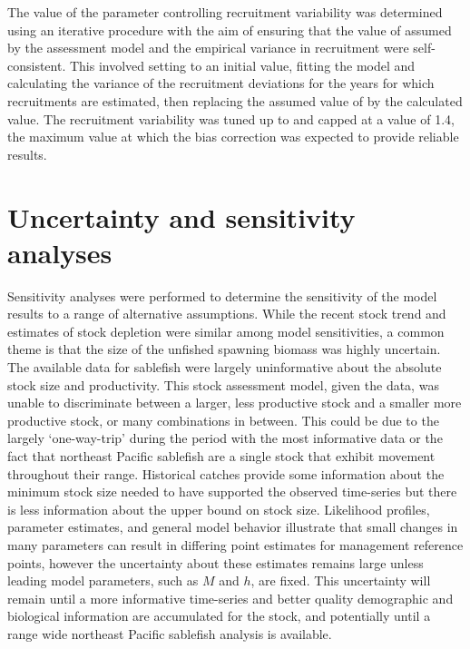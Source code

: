 \documentclass[11pt,
  english,
  a4paper,
]{article}
\begin{document}
\leavevmode\tagmcend\tagstructend\par


The value of the parameter controlling recruitment variability was determined using an iterative procedure with the aim of ensuring that the value of assumed by the assessment model and the empirical variance in recruitment were self-consistent. This involved setting to an initial value, fitting the model and calculating the variance of the recruitment deviations for the years for which recruitments are estimated, then replacing the assumed value of by the calculated value. The recruitment variability was tuned up to and capped at a value of 1.4, the maximum value at which the bias correction was expected to provide reliable results.

\leavevmode\tagmcend\tagstructend\par


\hypertarget{uncertainty-and-sensitivity-analyses}{%
\section{Uncertainty and sensitivity analyses}\label{uncertainty-and-sensitivity-analyses}}

\leavevmode\tagmcend\tagstructend


Sensitivity analyses were performed to determine the sensitivity of the model results to a range of alternative assumptions. While the recent stock trend and estimates of stock depletion were similar among model sensitivities, a common theme is that the size of the unfished spawning biomass was highly uncertain. The available data for sablefish were largely uninformative about the absolute stock size and productivity. This stock assessment model, given the data, was unable to discriminate between a larger, less productive stock and a smaller more productive stock, or many combinations in between. This could be due to the largely `one-way-trip' during the period with the most informative data or the fact that northeast Pacific sablefish are a single stock that exhibit movement throughout their range. Historical catches provide some information about the minimum stock size needed to have supported the observed time-series but there is less information about the upper bound on stock size. Likelihood profiles, parameter estimates, and general model behavior illustrate that small changes in many parameters can result in differing point estimates for management reference points, however the uncertainty about these estimates remains large unless leading model parameters, such as {\(M\)\leavevmode\tagmcend\tagstructend} and {\(h\)\leavevmode\tagmcend\tagstructend}, are fixed. This uncertainty will remain until a more informative time-series and better quality demographic and biological information are accumulated for the stock, and potentially until a range wide northeast Pacific sablefish analysis is available.
\end{document}
